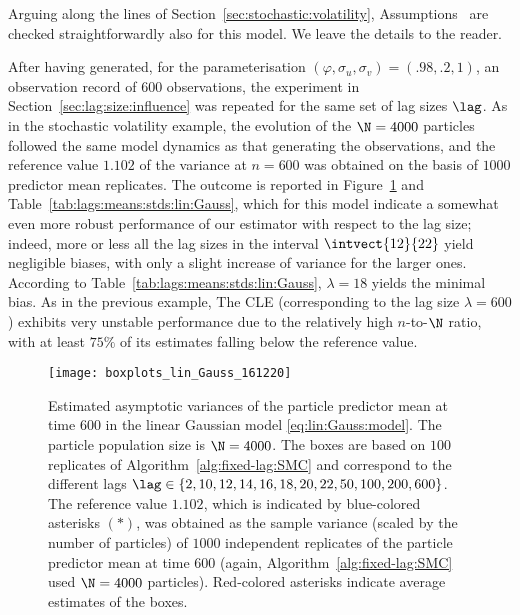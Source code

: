 Arguing along the lines of Section~\ref{sec:stochastic:volatility}, Assumptions~ are checked straightforwardly also for this model. We leave the details to the reader.   

After having generated, for the parameterisation $(\varphi, \sigma_u, \sigma_v) = (.98, .2, 1)$, an observation record of $600$ observations, the experiment in Section~\ref{sec:lag:size:influence} was repeated for the same set of lag sizes $\lag$. As in the stochastic volatility example, the evolution of the $\N = 4000$ particles followed the same model dynamics as that generating the observations, and the reference value $1.102$ of the variance at $n = 600$ was obtained on the basis of $1000$ predictor mean replicates. The outcome is reported in Figure~\ref{fig:boxplots:lin:Gauss} and Table~\ref{tab:lags:means:stds:lin:Gauss}, which for this model indicate a somewhat even more robust performance of our estimator with respect to the lag size; indeed, more or less all the lag sizes in the interval $\intvect{12}{22}$ yield negligible biases, with only a slight increase of variance for the larger ones. According to Table~\ref{tab:lags:means:stds:lin:Gauss}, $\lambda = 18$ yields the minimal bias. As in the previous example, The CLE (corresponding to the lag size $\lambda = 600$) exhibits very unstable performance due to the relatively high $n$-to-$\N$ ratio, with at least $75\%$ of its estimates falling below the reference value. 

\begin{figure}[H] 
\centering
\texttt{[image: boxplots\_lin\_Gauss\_161220]} %
\caption{Estimated asymptotic variances of the particle predictor mean at time $600$ in the linear Gaussian model \eqref{eq:lin:Gauss:model}. The particle population size is $\N = 4000$. The boxes are based on $100$ replicates of Algorithm~\ref{alg:fixed-lag:SMC} and correspond to the different lags $\lag \in \{2, 10, 12, 14, 16, 18, 20, 22, 50, 100, 200, 600\}$. The reference value $1.102$, which is indicated by blue-colored asterisks $(\ast)$, was obtained as the sample variance (scaled by the number of particles) of $1000$ independent replicates of the particle predictor mean at time $600$ (again, Algorithm~\ref{alg:fixed-lag:SMC} used $\N = 4000$ particles). Red-colored asterisks indicate average estimates of the boxes.}
\label{fig:boxplots:lin:Gauss}
\end{figure}

